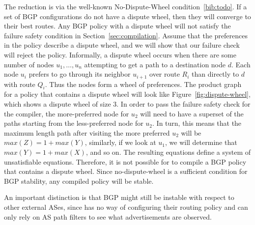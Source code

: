 The reduction is via the well-known No-Dispute-Wheel condition~\ref{bib:todo}. If a set of BGP configurations do not have a dispute wheel, then they will converge to their best routes. Any BGP policy with a dispute wheel will not satisfy the failure safety condition in Section~\ref{sec:compilation}. Assume that the preferences in the policy describe a dispute wheel, and we will show that our failure check will reject the policy. Informally, a dispute wheel occurs when there are some number of nodes $u_1, \dots, u_n$ attempting to get a path to a destination node $d$. Each node $u_i$ prefers to go through its neighbor $u_{i+1}$ over route $R_i$ than directly to $d$ with route $Q_i$. Thus the nodes form a wheel of preferences. The product graph for a policy that contains a dispute wheel will look like Figure~\ref{fig:dispute-wheel}, which shows a dispute wheel of size 3. In order to pass the failure safety check for the compiler, the more-preferred node for $u_2$ will need to have a superset of the paths starting from the less-preferred node for $u_2$. In turn, this means that the maximum length path after visiting the more preferred $u_2$ will be $max(Z) = 1 + max(Y)$, similarly, if we look at $u_1$, we will determine that $max(Y) = 1 + max(X)$, and so on. The resulting equations define a system of unsatisfiable equations. Therefore, it is not possible for \sysname to compile a BGP policy that contains a dispute wheel. Since no-dispute-wheel is a sufficient condition for BGP stability, any compiled \sysname policy will be stable.

An important distinction is that BGP might still be instable with respect to other external ASes, since \sysname has no way of configuring their routing policy and can only rely on AS path filters to see what advertisements are observed.

